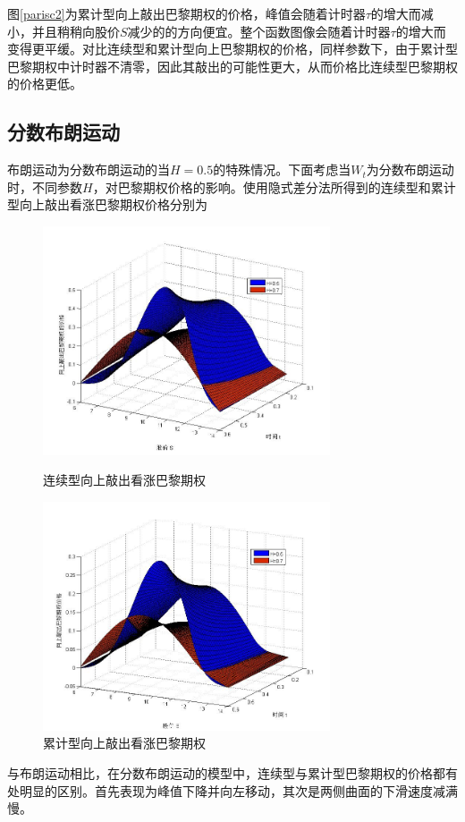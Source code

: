 \documentclass{ctexart} %
\begin{document}
图\ref{parisc2}为累计型向上敲出巴黎期权的价格，峰值会随着计时器$\tau$的增大而减小，并且稍稍向股价$S$减少的的方向便宜。整个函数图像会随着计时器$\tau$的增大而变得更平缓。对比连续型和累计型向上巴黎期权的价格，同样参数下，由于累计型巴黎期权中计时器不清零，因此其敲出的可能性更大，从而价格比连续型巴黎期权的价格更低。
\iffalse
\subsection{分数布朗运动}
布朗运动为分数布朗运动的当$H=0.5$的特殊情况。下面考虑当$W_t$为分数布朗运动时，不同参数$H$，对巴黎期权价格的影响。使用隐式差分法所得到的连续型和累计型向上敲出看涨巴黎期权价格分别为
\begin{figure}[H]
\begin{minipage}{0.48\linewidth}
\includegraphics[width=8.5cm]{code/paris_fbm1.jpg}
\caption{连续型向上敲出看涨巴黎期权}
\end{minipage}
\begin{minipage}{0.48\linewidth}
\includegraphics[width=8.5cm]{code/parisc_fbm1.jpg}
\caption{累计型向上敲出看涨巴黎期权}
\end{minipage}
\end{figure}
与布朗运动相比，在分数布朗运动的模型中，连续型与累计型巴黎期权的价格都有处明显的区别。首先表现为峰值下降并向左移动，其次是两侧曲面的下滑速度减满慢。
\end{document}
